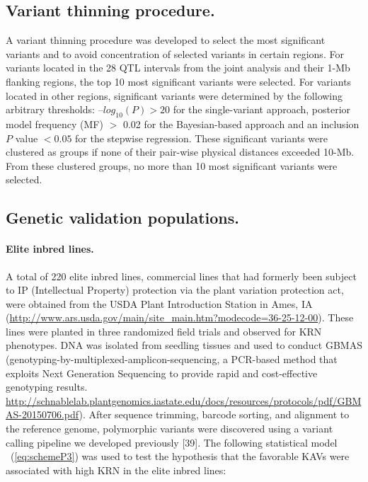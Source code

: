 \documentclass[10pt,letterpaper]{article}
\begin{document}
\subsection*{Variant thinning procedure.}
A variant thinning procedure was developed to select the most significant variants and to avoid concentration of selected variants in certain regions. For variants located in the 28 QTL intervals from the joint analysis and their 1-Mb flanking regions, the top 10 most significant variants were selected. For variants located in other regions, significant variants were determined by the following arbitrary thresholds: $–log_{10}(P) > 20$ for the single-variant approach, posterior model frequency (MF) $>$ 0.02 for the Bayesian-based approach and an inclusion $P$ value $< 0.05$ for the stepwise regression. These significant variants were clustered as groups if none of their pair-wise physical distances exceeded 10-Mb. From these clustered groups, no more than 10 most significant variants were selected.        

\subsection*{Genetic validation populations.} 
\paragraph{Elite inbred lines.}

A total of 220 elite inbred lines, commercial lines that had formerly been subject to IP (Intellectual Property) protection via the plant variation protection act, were obtained from the USDA Plant Introduction Station in Ames, IA (\url{http://www.ars.usda.gov/main/site_main.htm?modecode=36-25-12-00}). These lines were planted in three randomized field trials and observed for KRN phenotypes. DNA was isolated from seedling tissues and used to conduct GBMAS (genotyping-by-multiplexed-amplicon-sequencing, a PCR-based method that exploits Next Generation Sequencing to provide rapid and cost-effective genotyping results. \url{http://schnablelab.plantgenomics.iastate.edu/docs/resources/protocols/pdf/GBMAS-20150706.pdf}). After sequence trimming, barcode sorting, and alignment to the reference genome, polymorphic variants were discovered using a variant calling pipeline we developed previously [39].
%
The following statistical model ~(\ref{eq:schemeP3}) was used to test the hypothesis that the favorable KAVs were associated with high KRN in the elite inbred lines:
\end{document}
